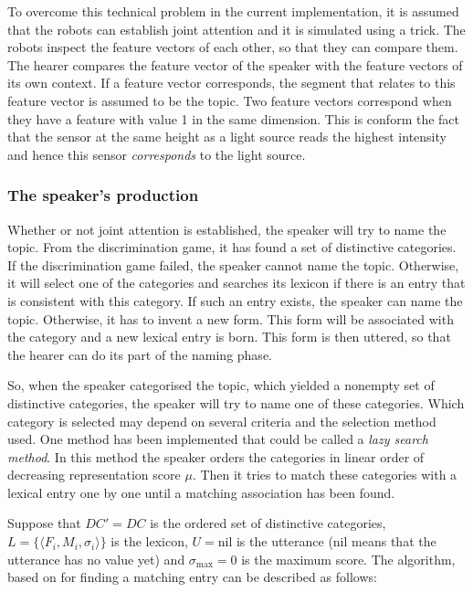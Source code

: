 To overcome this technical problem in the current implementation, it is assumed that the robots can establish joint attention and it is simulated using a trick. The robots inspect the feature vectors of each other, so that they can compare them. The hearer compares the feature vector of the speaker with the feature vectors of its own context. If a feature vector corresponds, the segment that relates to this feature vector is assumed to be the topic. Two feature vectors correspond when they have a feature with value 1 in the same dimension. This is conform the fact that the sensor at the same height as a light source reads the highest intensity and hence this sensor {\em corresponds} to the light source.


\subsubsection{The speaker's production}\label{s:cm:production}

Whether or not joint attention is established, the speaker will try to name the topic. From the discrimination game, it has found a set of distinctive categories. If the discrimination game failed, the speaker cannot name the topic. Otherwise, it will select one of the categories and searches its lexicon if there is an entry that is consistent with this category. If such an entry exists, the speaker can name the topic. Otherwise, it has to invent a new form. This form will be associated with the category and a new lexical entry is born. This form is then uttered, so that the hearer can do its part of the naming phase. 

So, when the speaker categorised the topic, which yielded a nonempty set of distinctive categories, the speaker will try to name one of these categories. Which category is selected may depend on several criteria and the selection method used. One method has been implemented that could be called a {\em lazy search method}. In this method the speaker orders the categories in linear order of decreasing representation score $\mu$. Then it tries to match these categories with a lexical entry one by one until a matching association has been found.

Suppose that $DC'=DC$ is the ordered set of distinctive categories, $L=\{\langle F_i,M_i,\sigma_i \rangle \}$ is the lexicon, $U=\mbox{nil}$ is the utterance (nil means that the utterance has no value yet) and $\sigma_{\mbox{max}}=0$ is the maximum score. The algorithm, based on \citet{steels:1996a} for finding a matching entry can be described as follows:

